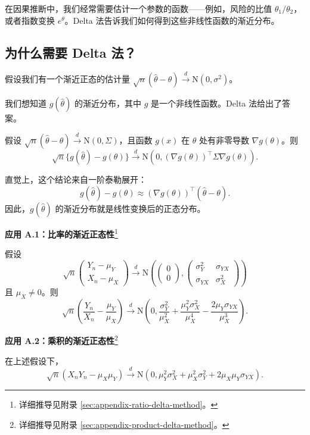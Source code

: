 在因果推断中，我们经常需要估计一个参数的函数——例如，风险的比值 $\theta_1/\theta_2$，或者指数变换 $e^\theta$。Delta 法告诉我们如何得到这些非线性函数的渐近分布。

\subsection{为什么需要 Delta 法？}

假设我们有一个渐近正态的估计量 $\sqrt{n}(\hat{\theta} - \theta) \xrightarrow{d} \mathrm{N}(0, \sigma^2)$。

我们想知道 $g(\hat{\theta})$ 的渐近分布，其中 $g$ 是一个非线性函数。Delta 法给出了答案。

\begin{Theorem}[Delta 法]\label{def:delta-method}
假设 $\sqrt{n}(\hat{\theta} - \theta) \xrightarrow{d} \mathrm{N}(0, \Sigma)$，且函数 $g(x)$ 在 $\theta$ 处有非零导数 $\nabla g(\theta)$。则
\[
\sqrt{n}\{g(\hat{\theta}) - g(\theta)\} \xrightarrow{d} \mathrm{N}\left(0, (\nabla g(\theta))^\top \Sigma \nabla g(\theta)\right).
\]
\end{Theorem}

直觉上，这个结论来自一阶泰勒展开：
\[
g(\hat{\theta}) - g(\theta) \approx (\nabla g(\theta))^\top (\hat{\theta} - \theta).
\]
因此，$g(\hat{\theta})$ 的渐近分布就是线性变换后的正态分布。

\textbf{应用 A.1：比率的渐近正态性}\footnote{详细推导见附录 \cref{sec:appendix-ratio-delta-method}。}

假设
\[
\sqrt{n}\begin{pmatrix} Y_n - \mu_Y \\ X_n - \mu_X \end{pmatrix} \xrightarrow{d} \mathrm{N}\left(\begin{pmatrix} 0 \\ 0 \end{pmatrix}, \begin{pmatrix} \sigma_Y^2 & \sigma_{YX} \\ \sigma_{YX} & \sigma_X^2 \end{pmatrix}\right)
\]
且 $\mu_X \neq 0$。则
\[
\sqrt{n}\left(\frac{Y_n}{X_n} - \frac{\mu_Y}{\mu_X}\right) \xrightarrow{d} \mathrm{N}\left(0, \frac{\sigma_Y^2}{\mu_X^2} + \frac{\mu_Y^2 \sigma_X^2}{\mu_X^4} - \frac{2\mu_Y \sigma_{YX}}{\mu_X^3}\right).
\]

\textbf{应用 A.2：乘积的渐近正态性}\footnote{详细推导见附录 \cref{sec:appendix-product-delta-method}。}

在上述假设下，
\[
\sqrt{n}(X_n Y_n - \mu_X \mu_Y) \xrightarrow{d} \mathrm{N}\left(0, \mu_Y^2 \sigma_X^2 + \mu_X^2 \sigma_Y^2 + 2\mu_X \mu_Y \sigma_{YX}\right).
\]

